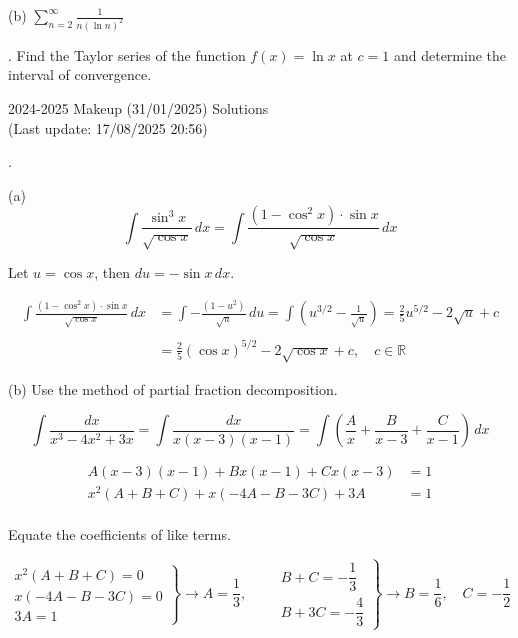 \documentclass{article}
\begin{document}
\noindent (b) $\displaystyle\sum_{n=2}^\infty\frac1{n(\ln n)^2}$

\hfill

. Find the Taylor series of the function $f(x)=\ln x$ at $c=1$ and determine the interval of convergence.

\newpage

\begin{center}
2024-2025 Makeup (31/01/2025) Solutions\\
(Last update: 17/08/2025 20:56)
\end{center}

.

\hfill

\noindent (a)
\[\int\frac{\sin^3x}{\sqrt{\cos x}}\,dx=\int\frac{\left(1-\cos^2x\right)\cdot\sin x}{\sqrt{\cos x}}\,dx\]

\hfill

\noindent Let $u=\cos x$, then $du=-\sin x\,dx$.

\begin{align*}\int\frac{\left(1-\cos^2x\right)\cdot\sin x}{\sqrt{\cos x}}\,dx&=\int-\frac{\left(1-u^2\right)}{\sqrt{u}}\,du=\int\left(u^{3/2}-\frac1{\sqrt u}\right)=\frac25u^{5/2}-2\sqrt u+c\\\\&=\boxed{\frac25\left(\cos x\right)^{5/2}-2\sqrt{\cos x}+c,\quad c\in\mathbb{R}}\end{align*}

\hfill

\noindent (b) Use the method of partial fraction decomposition.

\[\int\frac{dx}{x^3-4x^2+3x}=\int\frac{dx}{x(x-3)(x-1)}=\int\left(\frac Ax+\frac B{x-3}+\frac C{x-1}\right)\,dx\]

\[\begin{array}{rc}A(x-3)(x-1)+Bx(x-1)+Cx(x-3)&=1\\x^2(A+B+C)+x(-4A-B-3C)+3A&=1\\&\end{array}\]

\hfill

\noindent Equate the coefficients of like terms.

\[\left.\begin{array}{r}
x^2(A+B+C)=0\\
x(-4A-B-3C)=0\\
3A=1
\end{array}\right\}\rightarrow A=\frac13,\qquad\left.\begin{array}{r}
B+C=-\dfrac13\\[1em]
B+3C=-\dfrac43
\end{array}\right\}\rightarrow B=\frac16,\quad C=-\frac12\]
\end{document}
